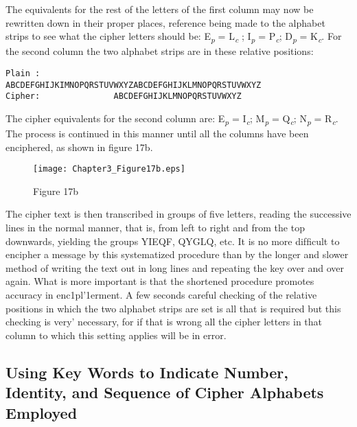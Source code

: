 The equivalents for the rest of the letters of the ﬁrst column may now
be rewritten down in their proper places, reference being made to the
alphabet strips to see what the cipher letters should be: E\textsubscript{\textit{p}} = L\textsubscript{\textit{c}} ;
I\textsubscript{\textit{p}} = P\textsubscript{\textit{c}}; D\textsubscript{\textit{p}} = K\textsubscript{\textit{c}}.
For the second column the two alphabet strips are in these relative positions:

\begin{verbatim}
Plain :
ABCDEFGHIJKIMNOPQRSTUVWXYZABCDEFGHIJKLMNOPQRSTUVWXYZ
Cipher:               ABCDEFGHIJKLMNOPQRSTUVWXYZ
\end{verbatim}

The cipher equivalents for the second column are: E\textsubscript{\textit{p}} = I\textsubscript{\textit{c}}; M\textsubscript{\textit{p}} = Q\textsubscript{\textit{c}};
N\textsubscript{\textit{p}} = R\textsubscript{\textit{c}}. The process is continued in this manner until all the columns
have been enciphered, as shown in ﬁgure 17b.

\begin{figure}[h]
 \centering
 \texttt{[image: Chapter3\_Figure17b.eps]}
 \caption{Figure 17b}
\end{figure}

The cipher text is then transcribed in groups of ﬁve letters, reading
the successive lines in the normal manner, that is, from left to right and
from the top downwards, yielding the groups YIEQF, QYGLQ, etc. It is
no more difﬁcult to encipher a message by this systematized procedure
than by the longer and slower method of writing the text out in long
lines and repeating the key over and over again. What is more important
is that the shortened procedure promotes accuracy in enc1pl'1erment. A
few seconds careful checking of the relative positions in which the two
alphabet strips are set is all that is required but this checking is very'
necessary, for if that is wrong all the cipher letters in that column to
which this setting applies will be in error.

\subsection{Using Key Words to Indicate Number, Identity, and Sequence of Cipher Alphabets Employed}

